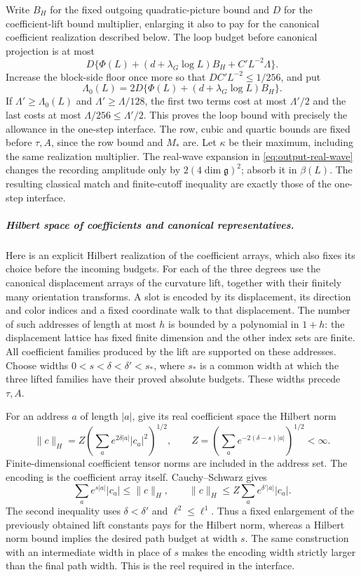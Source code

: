 Write $B_H$ for the fixed outgoing quadratic-picture bound and $D$ for
the coefficient-lift bound multiplier, enlarging it also to pay for the
canonical coefficient realization described below. The loop budget before
canonical projection is at most
\[
 D\{\Phi(L)+(d+\lambda_G\log L)B_H+C'L^{-2}\Lambda\}.
\]
Increase the block-side floor once more so that $DC'L^{-2}\leq1/256$,
and put
\[
 \Lambda_0(L)=2D\{\Phi(L)+(d+\lambda_G\log L)B_H\}.
\]
If $\Lambda'\geq\Lambda_0(L)$ and $\Lambda'\geq\Lambda/128$, the
first two terms cost at most $\Lambda'/2$ and the last costs at most
$\Lambda/256\leq\Lambda'/2$. This proves the loop bound with precisely
the allowance in the one-step interface. The row, cubic and quartic
bounds are fixed before $\tau,A$, since the row bound and $M_*$ are.
Let $\kappa$ be their maximum, including the same realization multiplier.
The real-wave expansion in \eqref{eq:output-real-wave} changes the recording
amplitude only by $2(4\dim\mathfrak g)^2$; absorb it in $\beta(L)$.
The resulting classical match and finite-cutoff inequality are exactly
those of the one-step interface.

\subparagraph{Hilbert space of coefficients and canonical representatives.}
Here is an explicit Hilbert realization of the coefficient arrays, which
also fixes its choice before the incoming budgets. For each of the three
degrees use the canonical displacement arrays of the curvature lift,
together with their finitely many orientation transforms. A slot is encoded
by its displacement, its direction and color indices and a fixed coordinate
walk to that displacement. The number of such addresses of length at most
$h$ is bounded by a polynomial in $1+h$: the displacement lattice has fixed
finite dimension and the other index sets are finite. All coefficient
families produced by the lift are supported on these addresses. Choose
widths $0<s<\delta<\delta'<s_*$, where $s_*$ is a common width at which the
three lifted families have their proved absolute budgets. These widths
precede $\tau,A$.

For an address $a$ of length $|a|$, give its real coefficient space the
Hilbert norm
\[
 \|c\|_H=Z\left(\sum_a e^{2\delta|a|}|c_a|^2\right)^{1/2},
 \qquad Z=\left(\sum_a e^{-2(\delta-s)|a|}\right)^{1/2}<\infty.
\]
Finite-dimensional coefficient tensor norms are included in the address
set. The encoding is the coefficient array itself. Cauchy--Schwarz gives
\[
 \sum_a e^{s|a|}|c_a|\leq\|c\|_H,
 \qquad
 \|c\|_H\leq Z\sum_a e^{\delta'|a|}|c_a|.
\]
The second inequality uses $\delta<\delta'$ and $\ell^2\leq\ell^1$.
Thus a fixed enlargement of the previously obtained lift constants pays
for the Hilbert norm, whereas a Hilbert norm bound implies the desired
path budget at width $s$. The same construction with an intermediate
width in place of $s$ makes the encoding width strictly larger than the
final path width. This is the reel required in the interface.

